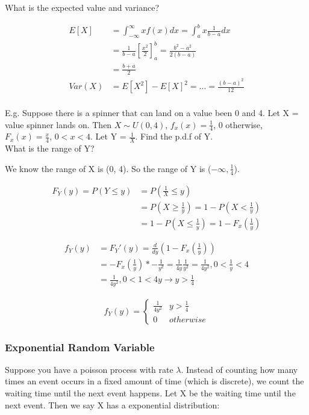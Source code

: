\documentclass[12pt, letterpaper]{article}
\begin{document}
What is the expected value and variance?

\begin{align*}
E[X] &= \int_{-\infty}^{\infty} x f\left(x\right) dx = \int_{a}^{b} x \frac{1}{b - a} dx\\
&= \frac{1}{b - a} \left[\frac{x^2}{2}\right]_{a}^{b} = \frac{b^2 - a^2}{2(b - a)}\\
&= \frac{b + a}{2}\\
Var\left(X\right) &= E[X^2] - E[X]^2 = ... = \frac{(b - a)^2}{12}
\end{align*}\\

E.g. Suppose there is a spinner that can land on a value been 0 and 4. Let X = value spinner lands on. Then \(X \sim U(0, 4)\), \(f_x \left(x\right) = \frac{1}{4}\), 0 otherwise, \(F_x \left(x\right) = \frac{x}{4}\), \(0 < x < 4\). Let Y = \(\frac{1}{X}\). Find the p.d.f of Y.\\

What is the range of Y?

We know the range of X is (0, 4). So the range of Y is (\(-\infty, \frac{1}{4}\)).

\begin{align*}
F_Y \left(y\right) = P\left(Y \leq y \right) &= P\left(\frac{1}{X} \leq y\right)\\
&= P\left(X \geq \frac{1}{y}\right) = 1 - P\left(X < \frac{1}{y}\right)\\
&= 1 - P\left(X \leq \frac{1}{y}\right) = 1 - F_x \left(\frac{1}{y}\right)
\end{align*}

\begin{align*}
f_Y \left(y\right) &= F_Y '\left(y\right) = \frac{d}{dy} \left(1 - F_x \left(\frac{1}{y}\right)\right)\\
&= -F_x \left(\frac{1}{y}\right) * -\frac{1}{y^2} = \frac{1}{4y} \frac{1}{y^2} = \frac{1}{4y^2}, 0 < \frac{1}{y} < 4\\
&= \frac{1}{4y^2}, 0 < 1 < 4y \rightarrow y > \frac{1}{4}
\end{align*}

\begin{align*}
f_Y \left(y\right) = 
	\begin{cases}
	\frac{1}{4y^2} & y > \frac{1}{4}\\
	0 & otherwise
	\end{cases}
\end{align*}

\subsubsection{Exponential Random Variable}
Suppose you have a poisson process with rate \(\lambda\). Instead of counting how many times an event occurs in a fixed amount of time (which is discrete), we count the waiting time until the next event happens. Let X be the waiting time until the next event. Then we say X has a exponential distribution:
\end{document}
